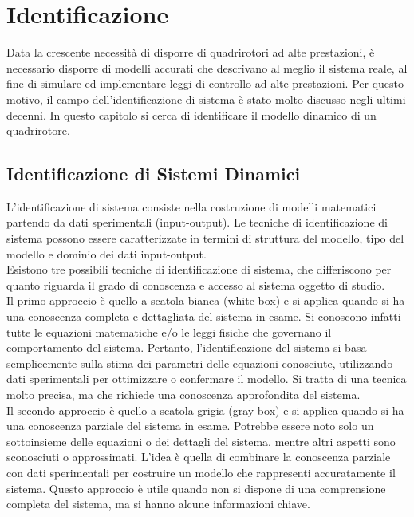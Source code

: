 
\chapter{Identificazione}\label{ch:ident}
Data la crescente necessità di disporre di quadrirotori ad alte prestazioni, è necessario disporre di modelli accurati che descrivano al meglio il sistema reale, al fine di simulare ed implementare leggi di controllo ad alte prestazioni. Per questo motivo, il campo dell'identificazione di sistema è stato molto discusso negli ultimi decenni. In questo capitolo si cerca di identificare il modello dinamico di un quadrirotore.


\section{Identificazione di Sistemi Dinamici}
L'identificazione di sistema consiste nella costruzione di modelli matematici partendo da dati sperimentali (input-output). Le tecniche di identificazione di sistema possono essere caratterizzate in termini di struttura del modello, tipo del modello e dominio dei dati input-output.\\

Esistono tre possibili tecniche di identificazione di sistema, che differiscono per quanto riguarda il grado di conoscenza e accesso al sistema oggetto di studio.\\

Il primo approccio è quello a scatola bianca (white box) e si applica quando si ha una conoscenza completa e dettagliata del sistema in esame. Si conoscono infatti tutte le equazioni matematiche e/o le leggi fisiche che governano il comportamento del sistema. Pertanto, l'identificazione del sistema si basa semplicemente sulla stima dei parametri delle equazioni conosciute, utilizzando dati sperimentali per ottimizzare o confermare il modello. Si tratta di una tecnica molto precisa, ma che richiede una conoscenza approfondita del sistema.\\

Il secondo approccio è quello a scatola grigia (gray box) e si applica quando si ha una conoscenza parziale del sistema in esame. Potrebbe essere noto solo un sottoinsieme delle equazioni o dei dettagli del sistema, mentre altri aspetti sono sconosciuti o approssimati. L'idea è quella di combinare la conoscenza parziale con dati sperimentali per costruire un modello che rappresenti accuratamente il sistema. Questo approccio è utile quando non si dispone di una comprensione completa del sistema, ma si hanno alcune informazioni chiave.\\


